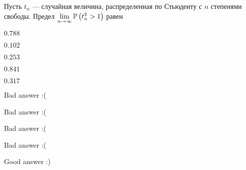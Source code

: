 
\begin{question}
Пусть \(t_n\) --- случайная величина, распределенная по Стьюденту с
\(n\) степенями свободы. Предел
\(\lim\limits_{n\to\infty}\P\left(t_{n}^2>1\right)\) равен
\begin{answerlist}
  \item \(0.788\)
  \item \(0.102\)
  \item \(0.253\)
  \item \(0.841\)
  \item \(0.317\)
\end{answerlist}
\end{question}

\begin{solution}
\begin{answerlist}
  \item Bad answer :(
  \item Bad answer :(
  \item Bad answer :(
  \item Bad answer :(
  \item Good answer :)
\end{answerlist}
\end{solution}


